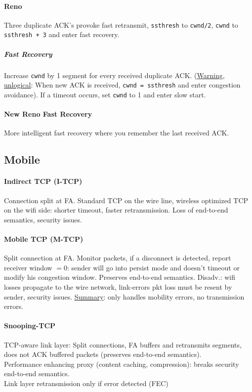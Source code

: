 \documentclass[6pt]{scrartcl}
\begin{document}
\begin{multicols}{4}
\paragraph{Reno} Three duplicate ACK's provoke fast retransmit, \texttt{ssthresh} to \texttt{cwnd/2}, \texttt{cwnd} to \texttt{ssthresh + 3} and enter fast recovery.

\subparagraph{Fast Recovery} Increase \texttt{cwnd} by 1 segment for every received duplicate ACK. (\underline{Warning, unlogical}: When new ACK is received, \texttt{cwnd = ssthresh} and enter congestion avoidance). If a timeout occurs, set \texttt{cwnd} to 1 and enter slow start.
\paragraph{New Reno Fast Recovery} More intelligent fast recovery where you remember the last received ACK.

\subsection{Mobile}
\paragraph{Indirect TCP (I-TCP)} Connection split at FA. Standard TCP on the wire line, wireless optimized TCP on the wifi side: shorter timeout, faster retransmission. Loss of end-to-end semantics, security issues.
\paragraph{Mobile TCP (M-TCP)} Split connection at FA. Monitor packets, if a disconnect is detected, report receiver window $= 0$: sender will go into persist mode and doesn't timeout or modify his congestion window. Preserves end-to-end semantics. Disadv.: wifi losses propagate to the wire network, link-errors pkt loss must be resent by sender, security issues. \underline{Summary}: only handles mobility errors, no transmission errors.

\paragraph{Snooping-TCP} TCP-aware link layer: Split connections, FA buffers and retransmits segments, does not ACK buffered packets (preserves end-to-end semantics).
\\Performance enhancing proxy (content caching, compression): breaks security end-to-end semantics.\\ Link layer retransmission only if error detected (FEC)

\end{multicols}
\end{document}
